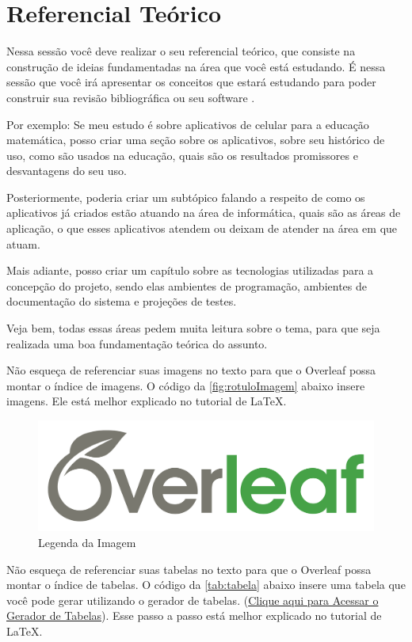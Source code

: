 \chapter{Referencial Teórico}  \label{cap:03}

Nessa sessão você deve realizar o seu referencial teórico, que consiste na construção de ideias fundamentadas na área que você está estudando.
É nessa sessão que você irá apresentar os conceitos que estará estudando para poder construir sua revisão bibliográfica ou seu software \cite{howlett_parsing_2022}.

Por exemplo:
Se meu estudo é sobre aplicativos de celular para a educação matemática, posso criar uma seção sobre os aplicativos, sobre seu histórico de uso, como são usados na educação, quais são os resultados promissores e desvantagens do seu uso.

Posteriormente, poderia criar um subtópico falando a respeito de como os aplicativos já criados estão atuando na área de informática, quais são as áreas de aplicação, o que esses aplicativos atendem ou deixam de atender na área em que atuam.

Mais adiante, posso criar um capítulo sobre as tecnologias utilizadas para a concepção do projeto, sendo elas ambientes de programação, ambientes de documentação do sistema e projeções de testes.

Veja bem, todas essas áreas pedem muita leitura sobre o tema, para que seja realizada uma boa fundamentação teórica do assunto.

Não esqueça de referenciar suas imagens no texto para que o Overleaf possa montar o índice de imagens. O código da \autoref{fig:rotuloImagem} abaixo insere imagens. Ele está melhor explicado no tutorial de LaTeX.\\

\begin{figure}[!h]
    \centering
    \includegraphics[width=0.7\linewidth]{imagens/exemplo.png}
    \caption{Legenda da Imagem}
    \label{fig:rotuloImagem}
\end{figure}
\newpage 

Não esqueça de referenciar suas tabelas no texto para que o Overleaf possa montar o índice de tabelas. O código da \autoref{tab:tabela} abaixo insere uma tabela que você pode gerar utilizando o gerador de tabelas. (\href{https://www.tablesgenerator.com/}{Clique aqui para Acessar o Gerador de Tabelas}). Esse passo a passo está melhor explicado no tutorial de LaTeX.\\


